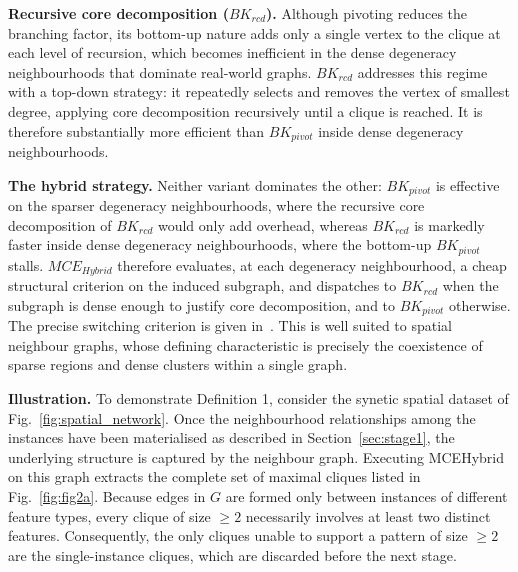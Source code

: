 \documentclass[12pt, letterpaper]{template}
\theoremstyle{definition}
\begin{document}
\noindent\textbf{Recursive core decomposition ($BK_{rcd}$).}
Although pivoting reduces the branching factor, its bottom-up nature adds
only a single vertex to the clique at each level of recursion, which
becomes inefficient in the dense degeneracy neighbourhoods that dominate
real-world graphs. $BK_{rcd}$ addresses this regime with a top-down
strategy: it repeatedly selects and removes the vertex of smallest degree,
applying core decomposition recursively until a clique is reached. It is
therefore substantially more efficient than $BK_{pivot}$ inside dense
degeneracy neighbourhoods.

\noindent\textbf{The hybrid strategy.}
Neither variant dominates the other: $BK_{pivot}$ is effective on the
sparser degeneracy neighbourhoods, where the recursive core decomposition
of $BK_{rcd}$ would only add overhead, whereas $BK_{rcd}$ is markedly
faster inside dense degeneracy neighbourhoods, where the bottom-up
$BK_{pivot}$ stalls. $MCE_{Hybrid}$ therefore evaluates, at each degeneracy
neighbourhood, a cheap structural criterion on the induced subgraph, and
dispatches to $BK_{rcd}$ when the subgraph is dense enough to justify core
decomposition, and to $BK_{pivot}$ otherwise. The precise switching
criterion is given in~\cite{li2019fast}. This is well suited to spatial neighbour graphs, whose defining
characteristic is precisely the coexistence of sparse regions and dense clusters within a
single graph.


\noindent\textbf{Illustration.}
To demonstrate Definition 1, consider the synetic spatial dataset of
Fig.~\ref{fig:spatial_network}. Once the neighbourhood relationships among the
instances have been materialised as described in
Section~\ref{sec:stage1}, the underlying structure is captured by the
neighbour graph. Executing MCEHybrid on this graph extracts the complete
set of maximal cliques listed in Fig.~\ref{fig:fig2a}. Because edges
in $G$ are formed only between instances of different feature types, every
clique of size $\ge 2$ necessarily involves at least two distinct
features. Consequently, the only cliques unable to support a pattern of
size $\ge 2$ are the single-instance cliques, which are discarded before
the next stage.
\end{document}
